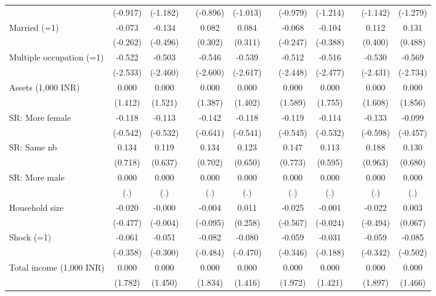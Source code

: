 {\begin{longtable}{@{\extracolsep{\fill}}lccccccccccc}
      & (-0.917) & (-1.182) &   & (-0.896) & (-1.013) &   & (-0.979) & (-1.214) &   & (-1.142) & (-1.279) \\
    Married (=1) & -0.073 & -0.134 &   & 0.082 & 0.084 &   & -0.068 & -0.104 &   & 0.112 & 0.131 \\
      & (-0.262) & (-0.496) &   & (0.302) & (0.311) &   & (-0.247) & (-0.388) &   & (0.400) & (0.488) \\
    Multiple occupation (=1) & -0.522 & -0.503 &   & -0.546 & -0.539 &   & -0.512 & -0.516 &   & -0.530 & -0.569 \\
      & (-2.533) & (-2.460) &   & (-2.600) & (-2.617) &   & (-2.448) & (-2.477) &   & (-2.431) & (-2.734) \\
    Assets (1,000 INR) & 0.000 & 0.000 &   & 0.000 & 0.000 &   & 0.000 & 0.000 &   & 0.000 & 0.000 \\
      & (1.412) & (1.521) &   & (1.387) & (1.402) &   & (1.589) & (1.755) &   & (1.608) & (1.856) \\
    SR: More female & -0.118 & -0.113 &   & -0.142 & -0.118 &   & -0.119 & -0.114 &   & -0.133 & -0.099 \\
      & (-0.542) & (-0.532) &   & (-0.641) & (-0.541) &   & (-0.545) & (-0.532) &   & (-0.598) & (-0.457) \\
    SR: Same nb & 0.134 & 0.119 &   & 0.134 & 0.123 &   & 0.147 & 0.113 &   & 0.188 & 0.130 \\
      & (0.718) & (0.637) &   & (0.702) & (0.650) &   & (0.773) & (0.595) &   & (0.963) & (0.680) \\
    SR: More male & 0.000 & 0.000 &   & 0.000 & 0.000 &   & 0.000 & 0.000 &   & 0.000 & 0.000 \\
      & (.) & (.) &   & (.) & (.) &   & (.) & (.) &   & (.) & (.) \\
    Household size & -0.020 & -0.000 &   & -0.004 & 0.011 &   & -0.025 & -0.001 &   & -0.022 & 0.003 \\
      & (-0.477) & (-0.004) &   & (-0.095) & (0.258) &   & (-0.567) & (-0.024) &   & (-0.494) & (0.067) \\
    Shock (=1) & -0.061 & -0.051 &   & -0.082 & -0.080 &   & -0.059 & -0.031 &   & -0.059 & -0.085 \\
      & (-0.358) & (-0.300) &   & (-0.484) & (-0.470) &   & (-0.346) & (-0.188) &   & (-0.342) & (-0.502) \\
    Total income (1,000 INR) & 0.000 & 0.000 &   & 0.000 & 0.000 &   & 0.000 & 0.000 &   & 0.000 & 0.000 \\
      & (1.782) & (1.450) &   & (1.834) & (1.416) &   & (1.972) & (1.421) &   & (1.897) & (1.466) \\

\end{longtable}}
